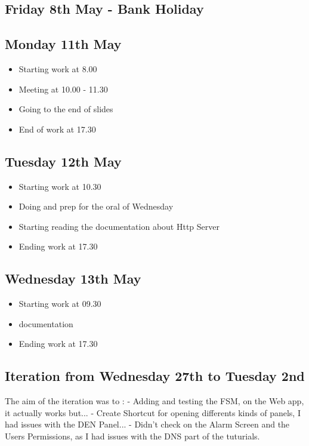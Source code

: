 \documentclass[a4paper, 10pt]{article}
\begin{document}
\subsection*{Friday 8th May - Bank Holiday}

\subsection*{Monday 11th May}
\begin{itemize}
    \item Starting work at 8.00
    \item Meeting at 10.00 - 11.30
    \item Going to the end of slides
    \item End of work at 17.30
\end{itemize}

\subsection*{Tuesday 12th May}
\begin{itemize}
    \item Starting work at 10.30
    \item Doing and prep for the oral of Wednesday
    \item Starting reading the documentation about Http Server
    \item Ending work at 17.30
\end{itemize}

\subsection*{Wednesday 13th May}
\begin{itemize}
    \item Starting work at 09.30
    \item documentation
    \item Ending work at 17.30
\end{itemize}

\subsection{Iteration from Wednesday 27th to Tuesday 2nd}
The aim of the iteration was to :
    - Adding and testing the FSM, on the Web app, it actually works but...
    - Create Shortcut for opening differents kinds of panels, I had issues with the DEN Panel...
    - Didn't check on the Alarm Screen and the Users Permissions, as I had issues with the DNS part of the tuturials.
\end{document}
